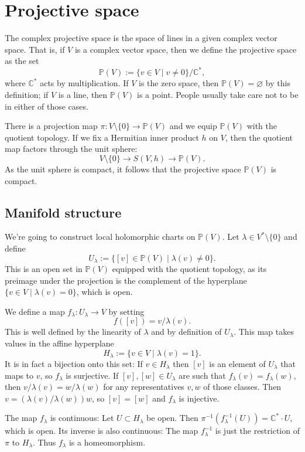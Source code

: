 \documentclass[10pt,a4paper]{article}
\newcommand{\kk}[1]{\mathbb{#1}}
\begin{document}
\section{Projective space}
\label{sec:orgcfabeed}

The complex projective space is the space of lines in a given complex vector space. That is, if $V$ is a complex vector space, then we define the projective space as the set
$$
\kk P(V) := \{ v \in V \mid v \not= 0 \} / \kk C^*,
$$
where $\kk C^*$ acts by multiplication. If $V$ is the zero space, then $\kk P(V) = \varnothing$ by this definition; if $V$ is a line, then $\kk P(V)$ is a point. People usually take care not to be in either of those cases.

There is a projection map $\pi : V \setminus \{0\} \to \kk P(V)$ and we equip $\kk P(V)$ with the quotient topology. If we fix a Hermitian inner product $h$ on $V$, then the quotient map factors through the unit sphere:
$$
V \setminus \{0\} \to S(V, h) \to \kk P(V).
$$
As the unit sphere is compact, it follows that the projective space $\kk P(V)$ is compact.


\subsection{Manifold structure}

We're going to construct local holomorphic charts on $\kk P(V)$. Let $\lambda \in V^* \setminus \{0\}$ and define
$$
U_\lambda := \{ [v] \in \kk P(V) \mid \lambda(v) \not= 0 \}.
$$
This is an open set in $\kk P(V)$ equipped with the quotient topology, as its preimage under the projection is the complement of the hyperplane $\{v \in V \mid \lambda(v) = 0\}$, which is open.

We define a map $f_\lambda: U_\lambda \to V$ by setting
$$
f([v]) = v/\lambda(v).
$$
This is well defined by the linearity of $\lambda$ and by definition of $U_\lambda$. This map takes values in the affine hyperplane
$$
H_\lambda := \{ v \in V \mid \lambda(v) = 1 \}.
$$
It is in fact a bijection onto this set: If $v \in H_\lambda$ then $[v]$ is an element of $U_\lambda$ that maps to $v$, so $f_\lambda$ is surjective. If $[v], [w] \in U_\lambda$ are such that $f_\lambda(v) = f_\lambda(w)$, then $v/\lambda(v) = w/\lambda(w)$ for any representatives $v, w$ of those classes. Then $v = (\lambda(v)/\lambda(w)) w$, so $[v] = [w]$ and $f_\lambda$ is injective.

The map $f_\lambda$ is continuous: Let $U \subset H_\lambda$ be open. Then $\pi^{-1}(f_\lambda^{-1}(U)) = \kk C^* \cdot U$, which is open. Its inverse is also continuous: The map $f_\lambda^{-1}$ is just the restriction of $\pi$ to $H_\lambda$. Thus $f_\lambda$ is a homeomorphism.
\end{document}
